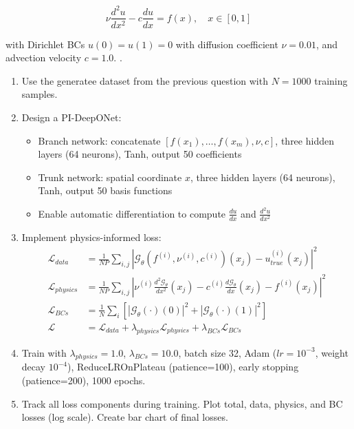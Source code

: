 \documentclass[11pt]{article}
\begin{document}
	\begin{equation*}
		\nu \frac{d^2u}{dx^2} - c \frac{du}{dx} = f(x), \quad x \in [0,1]
	\end{equation*}
	
	with Dirichlet BCs $u(0) = u(1) = 0$ with diffusion coefficient $\nu = 0.01$, and advection velocity $c = 1.0$. .
	
	\begin{enumerate}
		\item[\textbf{a)}] Use the generatee dataset from the previous question with $N = 1000$ training samples.
		
		\item[\textbf{b)}] Design a PI-DeepONet:
		\begin{itemize}
			\item Branch network: concatenate $[f(x_1), \ldots, f(x_m), \nu, c]$, three hidden layers (64 neurons), Tanh, output 50 coefficients
			\item Trunk network: spatial coordinate $x$, three hidden layers (64 neurons), Tanh, output 50 basis functions
			\item Enable automatic differentiation to compute $\frac{du}{dx}$ and $\frac{d^2u}{dx^2}$
		\end{itemize}
		
		\item[\textbf{c)}] Implement physics-informed loss:
		\begin{align*}
			\mathcal{L}_{data} &= \frac{1}{NP}\sum_{i,j} |\mathcal{G}_\theta(f^{(i)}, \nu^{(i)}, c^{(i)})(x_j) - u_{true}^{(i)}(x_j)|^2 \\
			\mathcal{L}_{physics} &= \frac{1}{NP}\sum_{i,j} \left|\nu^{(i)}\frac{d^2\mathcal{G}_\theta}{dx^2}(x_j) - c^{(i)}\frac{d\mathcal{G}_\theta}{dx}(x_j) - f^{(i)}(x_j)\right|^2 \\
			\mathcal{L}_{BCs} &= \frac{1}{N}\sum_i \left[|\mathcal{G}_\theta(\cdot)(0)|^2 + |\mathcal{G}_\theta(\cdot)(1)|^2\right] \\
			\mathcal{L} &= \mathcal{L}_{data} + \lambda_{physics}\mathcal{L}_{physics} + \lambda_{BCs}\mathcal{L}_{BCs}
		\end{align*}
		
		
		\item[\textbf{e)}] Train with $\lambda_{physics} = 1.0$, $\lambda_{BCs} = 10.0$, batch size 32, Adam ($lr = 10^{-3}$, weight decay $10^{-4}$), ReduceLROnPlateau (patience=100), early stopping (patience=200), 1000 epochs.
		
		\item[\textbf{f)}] Track all loss components during training. Plot total, data, physics, and BC losses (log scale). Create bar chart of final losses.
		

\end{enumerate}
\end{document}
